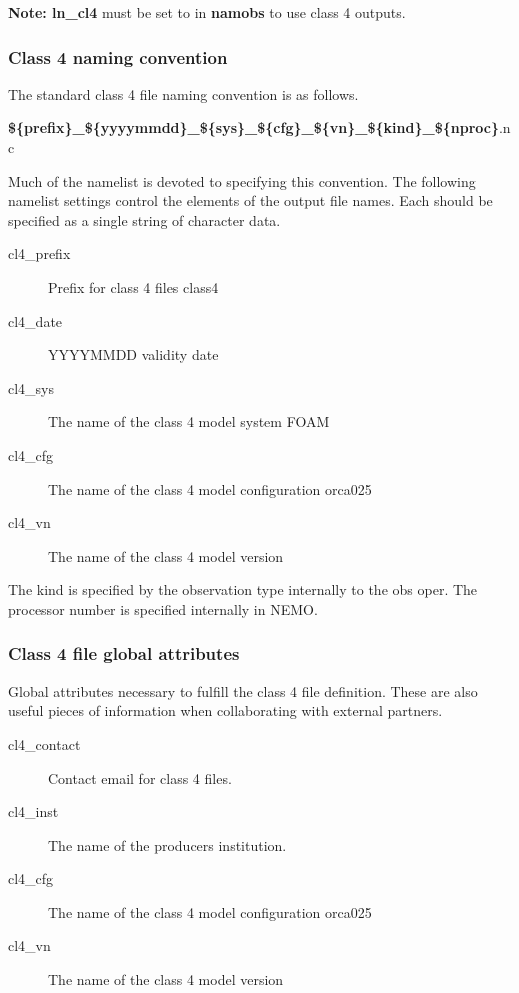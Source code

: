 \documentclass[../main/NEMO_manual]{subfiles}
\begin{document}
\textbf{Note: ln\_cl4} must be set to  in \textbf{namobs} to use class 4 outputs.

\subsubsection{Class 4 naming convention}

The standard class 4 file naming convention is as follows.

\noindent
\linebreak
\textbf{\$\{prefix\}\_\$\{yyyymmdd\}\_\$\{sys\}\_\$\{cfg\}\_\$\{vn\}\_\$\{kind\}\_\$\{nproc\}}.nc

\noindent
\linebreak
Much of the namelist is devoted to specifying this convention.
The following namelist settings control the elements of the output file names.
Each should be specified as a single string of character data.

\begin{description}
\item[cl4\_prefix]
  Prefix for class 4 files \eg class4
\item[cl4\_date]
  YYYYMMDD validity date
\item[cl4\_sys]
  The name of the class 4 model system \eg FOAM
\item[cl4\_cfg]
  The name of the class 4 model configuration \eg orca025
\item[cl4\_vn]
  The name of the class 4 model version 
\end{description}

\noindent
The kind is specified by the observation type internally to the obs oper.
The processor number is specified internally in NEMO. 

\subsubsection{Class 4 file global attributes}

Global attributes necessary to fulfill the class 4 file definition.
These are also useful pieces of information when collaborating with external partners.

\begin{description}
\item[cl4\_contact]
  Contact email for class 4 files.
\item[cl4\_inst]
  The name of the producers institution.
\item[cl4\_cfg]
  The name of the class 4 model configuration \eg orca025
\item[cl4\_vn]
  The name of the class 4 model version 
\end{description}
\end{document}
